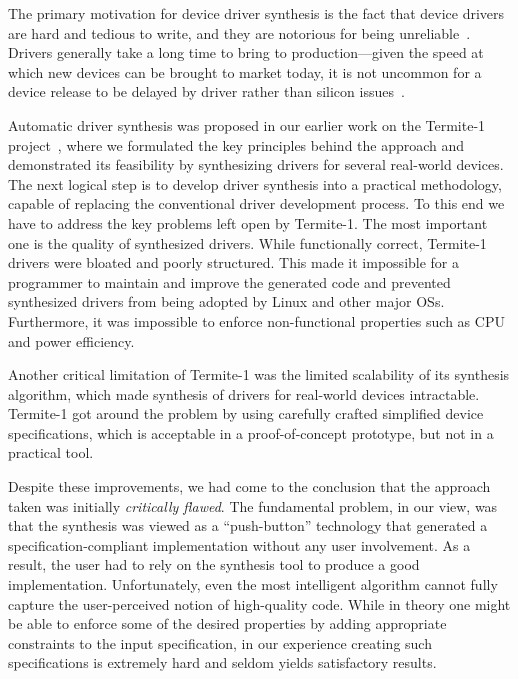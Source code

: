 \documentclass{book}
\theoremstyle{definition}
\begin{document}
The primary motivation for device driver synthesis is the fact that device drivers are hard and tedious to write, and they are notorious for being unreliable~\cite{Chou_YCHE_01,Ganapathi_GP_06}. Drivers generally take a long time to bring to production---given the speed at which new devices can be brought to market today, it is not uncommon for a device release to be delayed by driver rather than silicon issues~\cite{Yavatkar_12}. 

Automatic driver synthesis was proposed in our earlier work on the Termite-1 project~\cite{Ryzhyk_CKSH_09}, where we formulated the key principles behind the approach and demonstrated its feasibility by synthesizing drivers for several real-world devices.  The next logical step is to develop driver synthesis into a practical methodology, capable of replacing the conventional driver development process.  To this end we have to address the key problems left open by Termite-1.  The most important one is the quality of synthesized drivers.  While functionally correct, Termite-1 drivers were bloated and poorly structured.  This made it impossible for a programmer to maintain 
and improve the generated code and prevented synthesized drivers from being adopted by Linux and other major OSs.  Furthermore, it was impossible to enforce non-functional properties such as CPU and power efficiency.

Another critical limitation of Termite-1 was the limited scalability of its synthesis algorithm, which made synthesis of drivers for real-world devices intractable. Termite-1 got around the problem by using carefully crafted simplified device specifications, which is acceptable in a proof-of-concept prototype, but not in a practical tool.

Despite these improvements, we had come to the conclusion that the approach taken was initially \emph{critically flawed}.  The fundamental problem, in our view, was that the synthesis was viewed as a ``push-button'' technology that generated a specification-compliant implementation without any user involvement.  As a result, the user had to rely on the synthesis tool to produce a good implementation.  Unfortunately, even the most intelligent algorithm cannot fully capture the user-perceived notion of high-quality code.  While in theory one might be able to enforce some of the desired properties by adding appropriate constraints to the input specification, in our experience creating such specifications is extremely hard and seldom yields satisfactory results.
\end{document}
